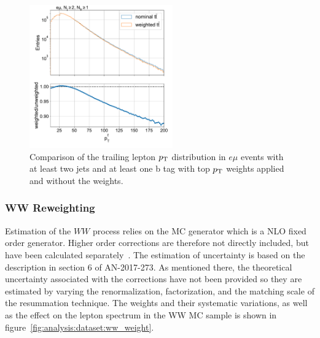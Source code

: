 \begin{figure}[ht]
    \centering
    \includegraphics[width=0.55\textwidth]{chapters/Analysis/sectionDataset/figures/top_pt_weight}
    \caption{Comparison of the trailing lepton $p_{\mathrm{T}}$ distribution in $e\mu$ events with at least two jets and at least one b tag with top $p_{\mathrm{T}}$ weights applied and without the weights.}
    \label{fig:analysis:dataset:top_pt_weight}
\end{figure}
\FloatBarrier

\subsubsection{WW \pt Reweighting}
Estimation of the $WW$ process relies on the \POWHEG MC generator which is a NLO fixed order generator. Higher order corrections are therefore not directly included, but have been calculated separately~\cite{Meade:2014fca, Jaiswal:2014yba, Grazzini:2015wpa}.  The estimation of uncertainty is based on the description in section 6 of AN-2017-273. As mentioned there, the theoretical uncertainty associated with the corrections have not been provided so they are estimated by varying the renormalization, factorization, and the matching scale of the \pt resummation technique. The weights and their systematic variations, as well as the effect on the lepton \pt spectrum in the WW MC sample is shown in figure~\ref{fig:analysis:dataset:ww_weight}.

